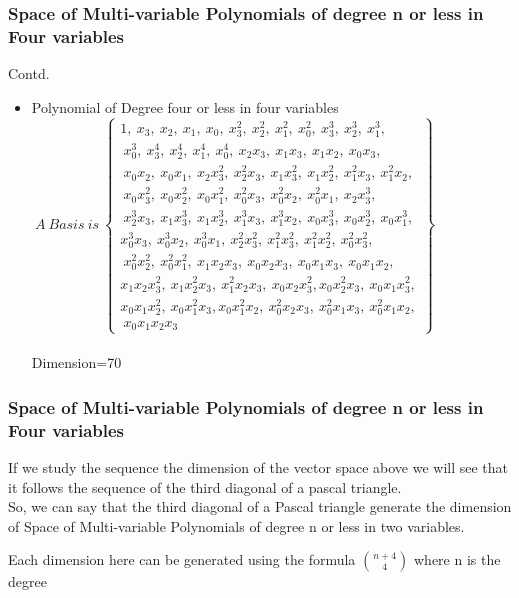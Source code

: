 \documentclass{beamer}
\begin{document}
\begin{frame}
\frametitle{Space of Multi-variable Polynomials of degree n or less in Four variables}
\begin{block}{Contd.}
\begin{itemize} 
\item Polynomial of Degree four or less in four variables \\
$~A~Basis~is~\begin{Bmatrix}1,~ x_3,~ x_2,~ x_1,~ x_0,~ x_3^2,~ x_2^2,~ x_1^2,~ x_0^2,~ x_3^3,~ x_2^3,~ x_1^3,\\
~ x_0^3,~ x_3^4,~ x_2^4,~ x_1^4,~ x_0^4,~ x_2x_3,
~ x_1x_3,~ x_1x_2,~ x_0x_3,\\
~ x_0x_2,~x_0x_1,~x_2x_3^2,~x_2^2x_3,~x_1x_3^2,~ x_1x_2^2,~ x_1^2x_3,~ x_1^2x_2,\\
~ x_0x_3^2,~ x_0x_2^2,~ x_0x_1^2,~ x_0^2x_3,~ x_0^2x_2,~ x_0^2x_1,~ x_2x_3^3,\\
~x_2^3x_3,~x_1x_3^3,~x_1x_2^3,~x_1^3x_3,~x_1^3x_2,~x_0x_3^3,~ x_0x_2^3,~ x_0x_1^3,\\ 
x_0^3x_3,~x_0^3x_2,~x_0^3x_1,~x_2^2x_3^2,~x_1^2x_3^2,~ x_1^2x_2^2,~ x_0^2x_3^2,\\
~ x_0^2x_2^2,~x_0^2x_1^2,~x_1x_2x_3,~x_0x_2x_3,
~x_0x_1x_3,~x_0x_1x_2,\\
x_1x_2x_3^2,~x_1x_2^2x_3,~x_1^2x_2x_3,~x_0x_2x_3^2,x_0x_2^2x_3,~x_0x_1x_3^2,\\
x_0x_1x_2^2,~x_0x_1^2x_3,x_0x_1^2x_2,~x_0^2x_2x_3,~ x_0^2x_1x_3,~ x_0^2x_1x_2,\\~ x_0x_1x_2x_3
\end{Bmatrix}$\\\\
Dimension=70
\end{itemize}
\end{block}
\end{frame}

\begin{frame}
\frametitle{Space of Multi-variable Polynomials of degree n or less in Four variables}
\begin{block}{}
If we study the sequence the dimension of the vector space above we will see that it follows the sequence of the third diagonal of a pascal triangle.\\
So, we can say that the third diagonal of a Pascal triangle generate the dimension of Space of Multi-variable Polynomials of degree n or less in two variables.

Each dimension here can be generated using the formula $n+4 \choose 4$ where n is the degree\\
\end{block}
\end{frame}
\end{document}

